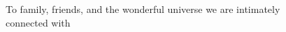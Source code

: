 \begin{figure}
\centering
{\large{}\selectfont 
To family, friends, and the wonderful universe we are intimately connected with
\\[4cm]\phantom{1}}
\end{figure}
